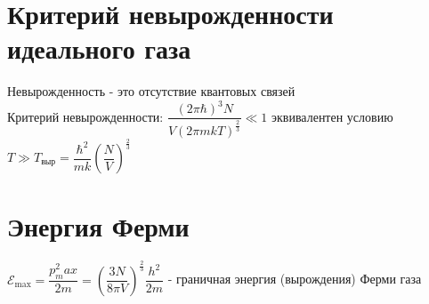 \begin{multicols*}{2}
		\section{Критерий невырожденности идеального газа}
		Невырожденность - это отсутствие квантовых связей\\
		Критерий невырожденности: $\dfrac{(2\pi \hbar)^3 N}{V(2\pi mkT)^{\frac{2}{3}}} \ll 1$ эквивалентен условию $T\gg T_{\text{выр}} = \dfrac{\hbar^2}{mk} \left(\dfrac{N}{V}\right)^{\frac{2}{3}}$\\

		\section{Энергия Ферми}
		${\mathcal{E}}_{\text{max}} = \dfrac{p^2_max}{2m} = \left(\dfrac{3N}{8\pi V}\right)^{\frac{2}{3}}\dfrac{h^2}{2m}$ - граничная энергия (вырождения) Ферми газа\\
	\end{multicols*}

